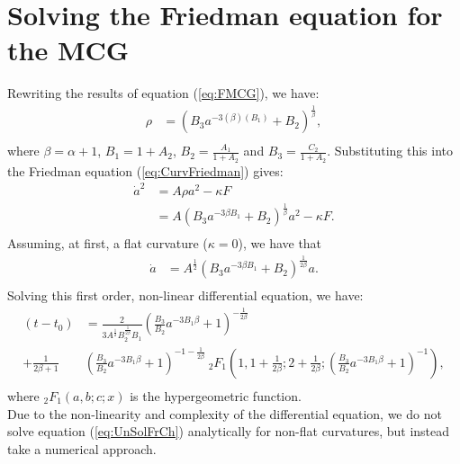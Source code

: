 \documentclass[a4paper, 11pt]{FSKH_623_Report}
\numberwithin{equation}{section}
\newcommand{\brac}[1]{\left(#1\right)}
\begin{document}
\section{Solving the Friedman equation for the MCG}
Rewriting the results of equation (\ref{eq:FMCG}), we have:
\begin{equation}\label{eq:ReFMCG}
\begin{split}
\rho&=\brac{B_{3}a^{-3\brac{\beta}\brac{B_{1}}}+B_{2}}^{\frac{1}{\beta}},\\
\end{split}
\end{equation}
where $\beta=\alpha+1$, $B_{1}=1+A_{2}$, $B_{2}=\frac{A_{1}}{1+A_{2}}$ and $B_{3}=\frac{C_{2}}{1+A_{2}}$. Substituting this into the Friedman equation (\ref{eq:CurvFriedman}) gives:
\begin{equation}\label{eq:UnSolFrCh}
\begin{split}
\dot{a}^{2} &= A\rho a^{2}-\kappa F\\
&= A\brac{B_{3}a^{-3\beta B_{1}}+B_{2}}^{\frac{1}{\beta}} a^{2}-\kappa F.\\
\end{split}
\end{equation}
Assuming, at first, a flat curvature ($\kappa=0$), we have that
\begin{equation}\label{eq:MCGFFC}
\begin{split}
\dot{a}&= A^{\frac{1}{2}}\brac{B_{3}a^{-3\beta B_{1}}+B_{2}}^{\frac{1}{2\beta}} a.\\
\end{split}
\end{equation}
Solving this first order, non-linear differential equation, we have:
\begin{equation}\label{eq:FmEqMCGSol}
\begin{split}
\brac{t-t_{0}}&=\frac{2}{3A^{\frac{1}{2}}B_{2}^{\frac{1}{2\beta}}B_{1}}\brac{\frac{B_{3}}{B_{2}}a^{-3B_{1}\beta}+1}^{-\frac{1}{2\beta}}\\
+\frac{1}{2\beta+1}&\brac{\frac{B_{3}}{B_{2}}a^{-3B_{1}\beta}+1}^{-1-\frac{1}{2\beta}}\ _{2}F_{1}\brac{1,1+\frac{1}{2\beta};2+\frac{1}{2\beta};\brac{\frac{B_{3}}{B_{2}}a^{-3B_{1}\beta}+1}^{-1}},\\
\end{split}
\end{equation}
where $_{2}F_{1}\brac{a,b;c;x}$ is the hypergeometric function. \\
Due to the non-linearity and complexity of the differential equation, we do not solve equation (\ref{eq:UnSolFrCh}) analytically for non-flat curvatures, but instead take a numerical approach.
\end{document}
